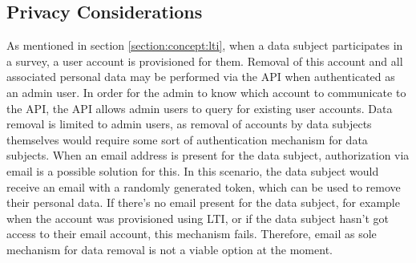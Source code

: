 \subsection{Privacy Considerations}
    As mentioned in section \ref{section:concept:lti}, when a data subject participates
    in a survey, a user account is provisioned for them. Removal
    of this account and all associated personal data may be performed
    via the API when authenticated as an admin user.
    In order for the admin to know which account to communicate
    to the API, the API allows admin users to query for existing
    user accounts. Data removal is limited to admin users,
    as removal of accounts by data subjects themselves would require
    some sort of authentication mechanism for data subjects.
    When an email address is present for the data subject,
    authorization via email is a possible solution for this.
    In this scenario, the data subject would receive an email
    with a randomly generated token, which can be used to remove their personal
    data. If there's no email present for the data subject, for example
    when the account was provisioned using LTI, or if the data subject
    hasn't got access to their email account, this mechanism fails.
    Therefore, email as sole mechanism for data removal is not a viable
    option at the moment.
    